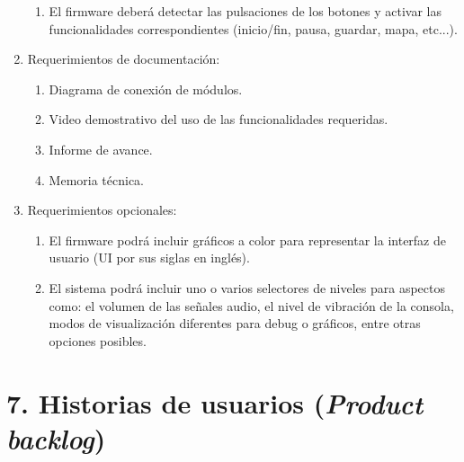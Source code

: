 \documentclass[
11pt, %
]{charter}
\begin{document}
\begin{enumerate}
\begin{enumerate}
		\item El firmware deberá detectar las pulsaciones de los botones y activar las funcionalidades correspondientes (inicio/fin, pausa, guardar, mapa, etc...).
	\end{enumerate}
	\item Requerimientos de documentación:
	\begin{enumerate}
		\item Diagrama de conexión de módulos.
		\item Video demostrativo del uso de las funcionalidades requeridas.
		\item Informe de avance.
		\item Memoria técnica.
	\end{enumerate}
	\item Requerimientos opcionales:
	\begin{enumerate}
		\item El firmware podrá incluir gráficos a color para representar la interfaz de usuario (UI por sus siglas en inglés).
		\item El sistema podrá incluir uno o varios selectores de niveles para aspectos como: el volumen de las señales audio, el nivel de vibración de la consola, modos de visualización diferentes para debug o gráficos, entre otras opciones posibles.
	\end{enumerate}
\end{enumerate}

\section{7. Historias de usuarios (\textit{Product backlog})}
\label{sec:backlog}
\end{document}
